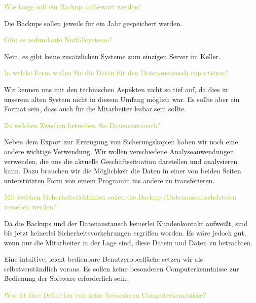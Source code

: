 \textcolor{YellowGreen}{Wie lange soll ein Backup aufbewart werden?}

\textcolor{NavyBlue}{Die Backups sollen jeweils für ein Jahr gespeichert werden.}



\textcolor{YellowGreen}{Gibt es redundante Notfallsysteme?}

\textcolor{NavyBlue}{Nein, es gibt keine zusätzlichen Systeme zum einzigen Server im Keller.}

\textcolor{YellowGreen}{In welche Form wollen Sie die Daten für den Datenaustausch exportieren?}

\textcolor{NavyBlue}{Wir kennen uns mit den technischen Aspekten nicht so tief auf, da dies in unserem alten System nicht in diesem Umfang möglich war. Es sollte aber ein Format sein, dass auch für die Mitarbeiter lesbar sein sollte.}

\textcolor{YellowGreen}{Zu welchen Zwecken betreiben Sie Datenaustausch?}

\textcolor{NavyBlue}{Neben dem Export zur Erzeugung von Sicherungskopien haben wir noch eine andere wichtige Verwendung. Wir wollen verschiedene Analyseanwendungen verwenden, die uns die aktuelle Geschäftssituation darstellen und analysieren kann. Dazu brauchen wir die Möglichkeit die Daten in einer von beiden Seiten unterstützten Form von einem Programm ins andere zu transferieren.}

\textcolor{YellowGreen}{Mit welchen Sicherheitsrichtlinien sollen die Backup-/Datenaustauschdateien versehen werden?}

\textcolor{NavyBlue}{Da die Backups und der Datenaustausch keinerlei Kundenkontakt aufweißt, sind bis jetzt keinerlei Sicherheitsvorkehrungen ergriffen worden. Es wäre jedoch gut, wenn nur die Mitarbeiter in der Lage sind, diese Datein und Daten zu betrachten.}

Eine intuitive, leicht bedienbare Benutzeroberfläche setzen wir als selbstverständlich voraus. 
Es sollen keine besonderen Computerkenntnisse zur Bedienung der Software erforderlich sein.  

\textcolor{YellowGreen}{Was ist Ihre Definition von \grqq{}keine besonderen Computerkenntnisse\grqq{}?}

